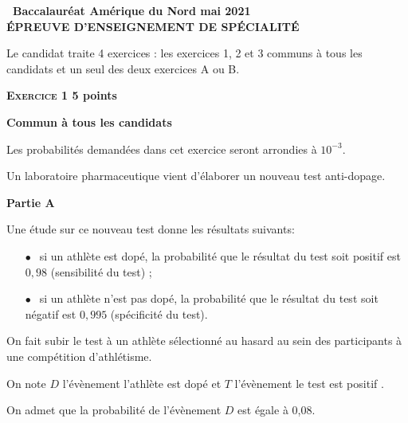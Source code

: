 \documentclass[11pt]{article}
\begin{document}
\setlength\parindent{0mm}
\pagestyle{fancy}
\thispagestyle{empty}

\begin{center}{\Large\textbf{\decofourleft~Baccalauréat Amérique du Nord mai 2021~\decofourright\\[6pt] ÉPREUVE D'ENSEIGNEMENT DE SPÉCIALITÉ}}
\end{center}

\vspace{0,25cm}

Le candidat traite 4 exercices : les exercices 1, 2 et 3 communs à tous les candidats et un seul des deux exercices A ou B.

\bigskip

\textbf{\textsc{Exercice 1} \hfill 5 points}

\textbf{Commun à tous les candidats}

\medskip


Les probabilités demandées dans cet exercice seront arrondies à $10^{-3}$.

\medskip

Un laboratoire pharmaceutique vient d'élaborer un nouveau test anti-dopage. 

\bigskip

\textbf{Partie A}

\medskip

Une étude sur ce nouveau test donne les résultats suivants:

\setlength\parindent{9mm}
\begin{itemize}
\item[$\bullet~~$] si un athlète est dopé, la probabilité que le résultat du test soit positif est $0,98$ (sensibilité du test) ;
\item[$\bullet~~$]si un athlète n'est pas dopé, la probabilité que le résultat du test soit négatif est $0,995$ (spécificité du test).
\end{itemize}
\setlength\parindent{0mm}

\smallskip

On fait subir le test à un athlète sélectionné au hasard au sein des participants à une compétition d'athlétisme. 

On note $D$ l'évènement \og l'athlète est dopé \fg{} et $T$ l'évènement \og le test est positif \fg. 

On admet que la probabilité de l'évènement $D$ est égale à 0,08.
\end{document}
